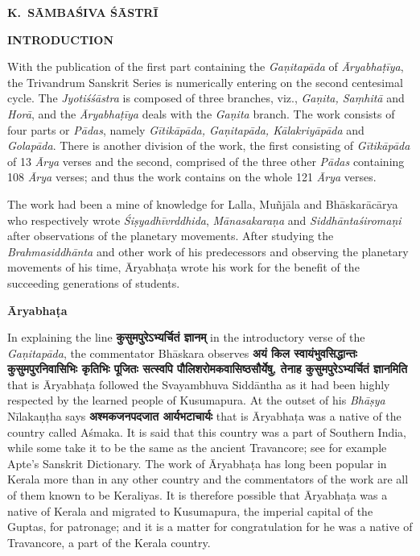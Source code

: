 \documentclass[11pt, openany]{book}
\begin{document}
\vspace{2cm}
\hspace{6.5cm} \textbf{\en K.~SĀMBAŚIVA ŚĀSTRĪ}


\newpage
\thispagestyle{empty}
\begin{center}
\textbf{INTRODUCTION}
\end{center}

{\en With the publication of the first part containing the \emph{Gaṇitapāda} of \emph{\en Āryabhaṭīya}, the Trivandrum Sanskrit Series is numerically entering on the second centesimal cycle. The \emph{Jyotiśśāstra} is composed of three branches, viz., \emph{Gaṇita, Saṃhitā} and \emph{Horā}, and the \emph{Āryabhaṭīya} deals with the \emph{Gaṇita} branch. The work consists of four parts or \emph{Pādas}, namely \emph{Gītikāpāda, Gaṇitapāda, Kālakriyāpāda} and \emph{Golapāda}. There is another division of the work, the first consisting of \emph{Gītikāpāda} of 13 \emph{Ārya} verses and the second, comprised of the three other \emph{Pādas} containing 108 \emph{Ārya} verses; and thus the work contains on the whole 121 \emph{Ārya} verses.

The work had been a mine of knowledge for Lalla, Muñjāla and Bhāskarācārya who respectively wrote \emph{Śiṣyadhīvrddhida}, \emph{Mānasakaraṇa} and \emph{Siddhāntaśiromaṇi} after observations of the planetary movements. After studying the \emph{Brahmasiddhānta} and other work of his predecessors and observing the planetary movements of his time, Āryabhaṭa wrote his work for the benefit of the succeeding generations of students.}

\begin{minipage}[t]{0.15\textwidth}
\vspace{3cm}
\textbf{{\en Āryabhaṭa}}
\end{minipage} 
\begin{minipage}[t]{0.55\textwidth} 
\vspace{-3mm}
{\en In explaining the line} \textbf{कुसुमपुरेऽभ्यर्चितं ज्ञानम्} {\en in the introductory verse of the \emph{Gaṇitapāda}, the commentator Bhāskara observes} \textbf{अयं किल स्वायंभुवसिद्धान्तः कुसुमपुरनिवासिभिः कृतिभिः पूजितः सत्स्वपि पौलिशरोमकवासिष्ठसौर्येषु, तेनाह कुसुमपुरेऽभ्यर्चितं ज्ञानमिति} {\en that is Āryabhaṭa followed the Svayambhuva Siddāntha as it had been highly respected by the learned people of Kusumapura. At the outset of his \emph{Bhāṣya} Nīlakaṇṭha says} \textbf{अश्मकजनपदजात आर्यभटाचार्यः} {\en that is Āryabhaṭa was a native of the country called Aśmaka. It is said that this country was a part of Southern India, while some take it to be the same as the ancient Travancore; see for example Apte's Sanskrit Dictionary. The work of Āryabhaṭa has long been popular in Kerala more than in any other country and the commentators of the work are all of them known to be Keraliyas. It is therefore possible that Āryabhaṭa was a native of Kerala and migrated to Kusumapura, the imperial capital of the Guptas, for patronage; and it is a matter for congratulation for he was a native of Travancore, a part of the Kerala country.}
\end{minipage} 
\end{document}

